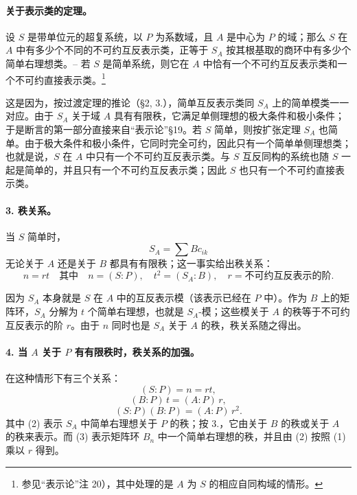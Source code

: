 \paragraph{关于表示类的定理。}
设 \(S\) 是带单位元的超复系统，以 \(P\) 为系数域，且 \(A\) 是中心为 \(P\) 的域；那么 \(S\) 在 \(A\) 中有多少个不同的不可约互反表示类，正等于 \(S_A\) 按其根基取的商环中有多少个简单右理想类。-- 若 \(S\) 是简单系统，则它在 \(A\) 中恰有一个不可约互反表示类和一个不可约直接表示类。\footnote{参见“表示论”注 20），其中处理的是 \(A\) 为 \(S\) 的相应自同构域的情形。}

这是因为，按过渡定理的推论（§2, 3.），简单互反表示类同 \(S_A\) 上的简单模类一一对应。由于 \(S_A\) 关于域 \(A\) 具有有限秩，它满足单侧理想的极大条件和极小条件；于是断言的第一部分直接来自“表示论”§19。若 \(S\) 简单，则按扩张定理 \(S_A\) 也简单。由于极大条件和极小条件，它同时完全可约，因此只有一个简单单侧理想类；也就是说，\(S\) 在 \(A\) 中只有一个不可约互反表示类。与 \(S\) 互反同构的系统也随 \(S\) 一起是简单的，并且只有一个不可约互反表示类；因此 \(S\) 也只有一个不可约直接表示类。

\paragraph{3. 秩关系。}
当 \(S\) 简单时，
\[
        S_A=\sum Bc_{ik}
\]
无论关于 \(A\) 还是关于 \(B\) 都具有有限秩；这一事实给出秩关系：
\[
        n=rt\quad\text{其中}\quad n=(S:P),\quad t^2=(S_A:B),
        \quad r=\text{不可约互反表示的阶}.                              \tag{1}
\]

因为 \(S_A\) 本身就是 \(S\) 在 \(A\) 中的互反表示模（该表示已经在 \(P\) 中）。作为 \(B\) 上的矩阵环，\(S_A\) 分解为 \(t\) 个简单右理想，也就是 \(S_A\)-模；这些模关于 \(A\) 的秩等于不可约互反表示的阶 \(r\)。由于 \(n\) 同时也是 \(S_A\) 关于 \(A\) 的秩，秩关系随之得出。

\paragraph{4. 当 \(A\) 关于 \(P\) 有有限秩时，秩关系的加强。}
在这种情形下有三个关系：
\[
        (S:P)=n=rt,                                                     \tag{1}
\]
\[
        (B:P)\,t=(A:P)\,r,                                               \tag{2}
\]
\[
        (S:P)(B:P)=(A:P)\,r^2.                                           \tag{3}
\]
其中 (2) 表示 \(S_A\) 中简单右理想关于 \(P\) 的秩；按 3.，它由关于 \(B\) 的秩或关于 \(A\) 的秩来表示。而 (3) 表示矩阵环 \(B_n\) 中一个简单右理想的秩，并且由 (2) 按照 (1) 乘以 \(r\) 得到。

